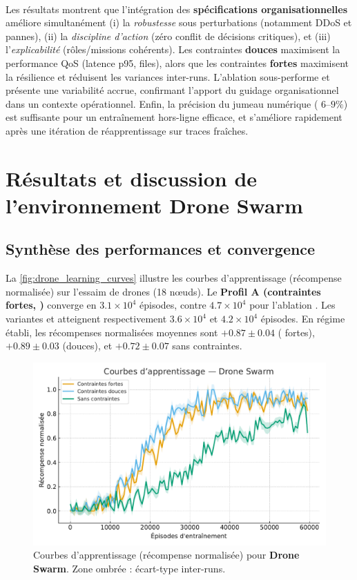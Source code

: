 \

Les résultats montrent que l’intégration des \textbf{spécifications organisationnelles} améliore simultanément (i) la \emph{robustesse} sous perturbations (notamment DDoS et pannes), (ii) la \emph{discipline d’action} (zéro conflit de décisions critiques), et (iii) l’\emph{explicabilité} (rôles/missions cohérents).
Les contraintes \textbf{douces} maximisent la performance QoS (latence p95, files), alors que les contraintes \textbf{fortes} maximisent la résilience et réduisent les variances inter-runs.
L’ablation \texttt{} sous-performe et présente une variabilité accrue, confirmant l’apport du guidage organisationnel dans un contexte opérationnel.
Enfin, la précision du jumeau numérique ( $6$--$9\%$) est suffisante pour un entraînement hors-ligne efficace, et s’améliore rapidement après une itération de réapprentissage sur traces fraîches.


\section{Résultats et discussion de l'environnement \textbf{Drone Swarm}}\label{sec:results_and_discussion_drone_swarm}

\subsection*{Synthèse des performances et convergence}

La \autoref{fig:drone_learning_curves} illustre les courbes d’apprentissage (récompense normalisée) sur l’essaim de drones (18 nœuds).
Le \textbf{Profil A (contraintes fortes, )} converge en $3.1\times 10^4$ épisodes, contre $4.7\times 10^4$ pour l’ablation \texttt{}.
Les variantes  et  atteignent respectivement $3.6\times 10^4$ et $4.2\times 10^4$ épisodes.
En régime établi, les récompenses normalisées moyennes sont $+0.87 \pm 0.04$ ( fortes), $+0.89 \pm 0.03$ (douces), et $+0.72 \pm 0.07$ sans contraintes.

\begin{figure}[h!]
    \centering
    \includegraphics[width=0.75\linewidth]{figures/results_drone_learning.pdf}
    \caption[Courbes d’apprentissage (récompense normalisée) pour \textbf{Drone Swarm}]{Courbes d’apprentissage (récompense normalisée) pour \textbf{Drone Swarm}. Zone ombrée : écart-type inter-runs.}
    \label{fig:drone_learning_curves}
\end{figure}

